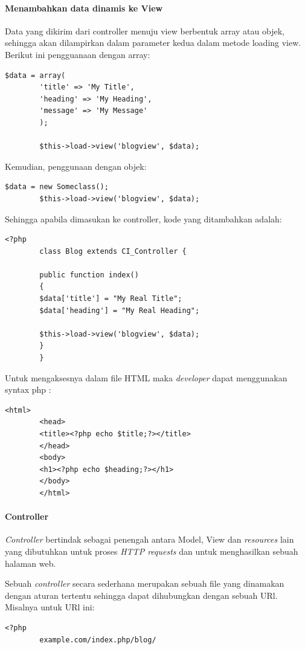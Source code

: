\documentclass[a4paper,twoside]{article}
\begin{document}
\begin{enumerate}
		\paragraph{Menambahkan data dinamis ke View}
		
		Data yang dikirim dari controller menuju view berbentuk array atau objek, sehingga akan dilampirkan dalam parameter kedua dalam metode loading view.
		Berikut ini pengguanaan dengan array:
		\begin{lstlisting}[frame=single] 
		$data = array(
		'title' => 'My Title',
		'heading' => 'My Heading',
		'message' => 'My Message'
		);
		
		$this->load->view('blogview', $data);
		\end{lstlisting}
		
		\noindent Kemudian, penggunaan dengan objek:
		\begin{lstlisting}[frame=single] 
		$data = new Someclass();
		$this->load->view('blogview', $data);
		\end{lstlisting}
		
		\noindent Sehingga apabila dimasukan ke controller, kode yang ditambahkan adalah:
		\begin{lstlisting}[frame=single] 
		<?php
		class Blog extends CI_Controller {
		
		public function index()
		{
		$data['title'] = "My Real Title";
		$data['heading'] = "My Real Heading";
		
		$this->load->view('blogview', $data);
		}
		}
		\end{lstlisting}
		
		Untuk mengaksesnya dalam file HTML maka \textit{developer} dapat menggunakan syntax php :
		\begin{lstlisting}[frame=single] 
		<html>
		<head>
		<title><?php echo $title;?></title>
		</head>
		<body>
		<h1><?php echo $heading;?></h1>
		</body>
		</html>
		\end{lstlisting}
		
		\paragraph{Controller} \par
		\textit{Controller} bertindak sebagai penengah antara Model, View dan \textit{resources} lain yang dibutuhkan untuk proses \textit{HTTP requests} dan untuk menghasilkan sebuah halaman web.
		
		Sebuah \textit{controller} secara sederhana merupakan sebuah file yang dinamakan dengan aturan tertentu sehingga dapat dihubungkan dengan sebuah URl.
		Misalnya untuk URl ini:
		\begin{lstlisting}[frame=single] 
		<?php
		example.com/index.php/blog/
		\end{lstlisting}
		

\end{enumerate}
\end{document}
